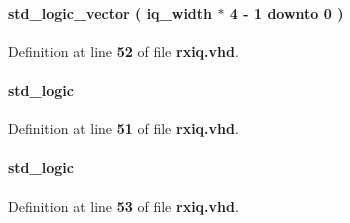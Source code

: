 \paragraph[{inst1\+\_\+fifo\+\_\+wdata}]{ {\bfseries \textcolor{comment}{std\+\_\+logic\+\_\+vector}\textcolor{vhdlchar}{ }\textcolor{vhdlchar}{(}\textcolor{vhdlchar}{ }\textcolor{vhdlchar}{ }\textcolor{vhdlchar}{ }\textcolor{vhdlchar}{ }{\bfseries {\bf iq\+\_\+width}} \textcolor{vhdlchar}{$\ast$}\textcolor{vhdlchar}{ } \textcolor{vhdldigit}{4} \textcolor{vhdlchar}{-\/}\textcolor{vhdlchar}{ } \textcolor{vhdldigit}{1} \textcolor{vhdlchar}{ }\textcolor{keywordflow}{downto}\textcolor{vhdlchar}{ }\textcolor{vhdlchar}{ } \textcolor{vhdldigit}{0} \textcolor{vhdlchar}{ }\textcolor{vhdlchar}{)}\textcolor{vhdlchar}{ }} \hspace{0.3cm}{\ttfamily [Signal]}}\label{classrxiq_1_1arch_a91f7db9d89531230134c3c88057ad8db}


Definition at line {\bf 52} of file {\bf rxiq.\+vhd}.

\paragraph[{inst1\+\_\+fifo\+\_\+wrreq}]{ {\bfseries \textcolor{comment}{std\+\_\+logic}\textcolor{vhdlchar}{ }} \hspace{0.3cm}{\ttfamily [Signal]}}\label{classrxiq_1_1arch_a286359d883f24bf07f12dd0a7c633579}


Definition at line {\bf 51} of file {\bf rxiq.\+vhd}.

\paragraph[{inst1\+\_\+reset\+\_\+n}]{ {\bfseries \textcolor{comment}{std\+\_\+logic}\textcolor{vhdlchar}{ }} \hspace{0.3cm}{\ttfamily [Signal]}}\label{classrxiq_1_1arch_aa53b96cdbf1158069a1632f79bceb64b}


Definition at line {\bf 53} of file {\bf rxiq.\+vhd}.

